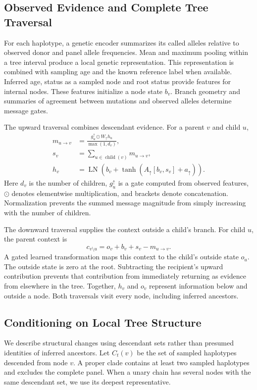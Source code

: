 \documentclass[letterpaper]{article}
\begin{document}
\subsection{Observed Evidence and Complete Tree Traversal}
For each haplotype, a genetic encoder summarizes its called alleles relative to observed donor and panel allele frequencies. Mean and maximum pooling within a tree interval produce a local genetic representation. This representation is combined with sampling age and the known reference label when available. Inferred age, status as a sampled node and root status provide features for internal nodes. These features initialize a node state $b_v$. Branch geometry and summaries of agreement between mutations and observed alleles determine message gates.

The upward traversal combines descendant evidence. For a parent $v$ and child $u$,
\begin{align}
m_{u\to v}
 &= \frac{g_u^\uparrow\odot W_\uparrow h_u}{\max(1,d_v)},\\
s_v &= \sum_{u\in\operatorname{child}(v)}m_{u\to v},\\
h_v &= \operatorname{LN}\!\left(
 b_v+\tanh(A_\uparrow[b_v,s_v]+a_\uparrow)\right).
\end{align}
Here $d_v$ is the number of children, $g_u^\uparrow$ is a gate computed from observed features, $\odot$ denotes elementwise multiplication, and brackets denote concatenation. Normalization prevents the summed message magnitude from simply increasing with the number of children.

The downward traversal supplies the context outside a child's branch. For child $u$, the parent context is
\begin{equation}
c_{v\setminus u}=o_v+b_v+s_v-m_{u\to v}.
\label{eq:outside}
\end{equation}
A gated learned transformation maps this context to the child's outside state $o_u$. The outside state is zero at the root. Subtracting the recipient's upward contribution prevents that contribution from immediately returning as evidence from elsewhere in the tree. Together, $h_v$ and $o_v$ represent information below and outside a node. Both traversals visit every node, including inferred ancestors.

\subsection{Conditioning on Local Tree Structure}
We describe structural changes using descendant sets rather than presumed identities of inferred ancestors. Let $C_t(v)$ be the set of sampled haplotypes descended from node $v$. A proper clade contains at least two sampled haplotypes and excludes the complete panel. When a unary chain has several nodes with the same descendant set, we use its deepest representative.
\end{document}
